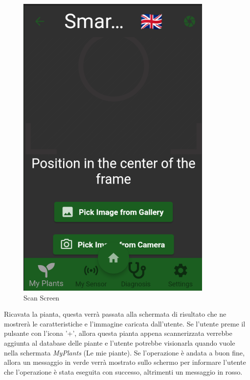 \documentclass[a4paper,12pt]{report}
\begin{document}
\begin{figure}[ht] 
	\centering
	\includegraphics[width=.3\textwidth, height=.3\textheight, keepaspectratio]{./images/scan/scan_screen.png}
	\caption{Scan Screen}
	\label{fig:scan}
\end{figure}

\textsf{\small Ricavata la pianta, questa verrà passata alla schermata di risultato che ne mostrerà le caratteristiche e l'immagine caricata dall'utente.}
\textsf{\small Se l'utente preme il pulsante con l'icona '+', allora questa pianta appena scannerizzata verrebbe aggiunta al database delle piante e l'utente potrebbe visionarla quando vuole nella schermata \emph{MyPlants} (Le mie piante).}
\textsf{\small Se l'operazione è andata a buon fine, allora un messaggio in verde verrà mostrato sullo schermo per informare l'utente che l'operazione è stata eseguita con successo, altrimenti un messaggio in rosso.}
\end{document}
